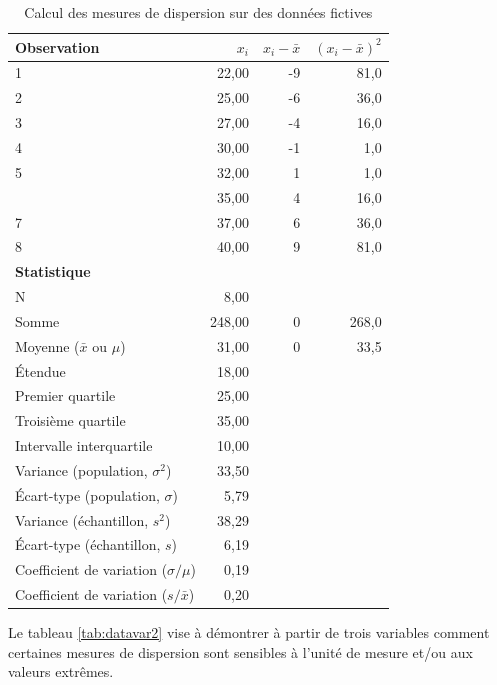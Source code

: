 \documentclass[
  11pt,
  french,
]{book}
\begin{document}
\begin{table}

\caption{\label{tab:datavar}Calcul des mesures de dispersion sur des données fictives}
\centering
\fontsize{8}{10}\selectfont
\begin{tabular}[t]{lrrr}
\toprule
Observation & $x_i$ & $x_i-\bar{x}$ & $(x_i-\bar{x})^2$\\
\midrule
1 & 22,00 & -9 & 81,0\\
2 & 25,00 & -6 & 36,0\\
3 & 27,00 & -4 & 16,0\\
4 & 30,00 & -1 & 1,0\\
5 & 32,00 & 1 & 1,0\\
\addlinespace
6 & 35,00 & 4 & 16,0\\
7 & 37,00 & 6 & 36,0\\
8 & 40,00 & 9 & 81,0\\
\textbf{Statistique} & \textbf{} & \textbf{} & \textbf{}\\
N & 8,00 &  & \\
\addlinespace
Somme & 248,00 & 0 & 268,0\\
Moyenne ($\bar{x}$ ou $\mu$) & 31,00 & 0 & 33,5\\
Étendue & 18,00 &  & \\
Premier quartile & 25,00 &  & \\
Troisième quartile & 35,00 &  & \\
\addlinespace
Intervalle interquartile & 10,00 &  & \\
Variance (population, $\sigma^2$) & 33,50 &  & \\
Écart-type (population, $\sigma$) & 5,79 &  & \\
Variance (échantillon, $s^2$) & 38,29 &  & \\
Écart-type (échantillon, $s$) & 6,19 &  & \\
\addlinespace
Coefficient de variation ($\sigma / \mu$) & 0,19 &  & \\
Coefficient de variation ($s / \bar{x}$) & 0,20 &  & \\
\bottomrule
\end{tabular}
\end{table}

Le tableau \ref{tab:datavar2} vise à démontrer à partir de trois variables comment certaines mesures de dispersion sont sensibles à l'unité de mesure et/ou aux valeurs extrêmes.
\end{document}
